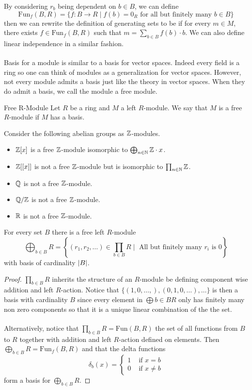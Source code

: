 \documentclass[a4paper]{article}
\begin{document}
By considering $r_b$ being dependent on $b\in B$, we can define $$\text{Fun}_f(B,R)=\{f:B\to R\;|\;f(b)=0_R\text{ for all but finitely many }b\in B\}$$ then we can rewrite the definition of generating sets to be if for every $m\in M$, there exists $f\in\text{Fun}_f(B,R)$ such that $m=\sum_{b\in B}f(b)\cdot b$. We can also define linear independence in a similar fashion. \\~\\

Basis for a module is similar to a basis for vector spaces. Indeed every field is a ring so one can think of modules as a generalization for vector spaces. However, not every module admits a basis just like the theory in vector spaces. When they do admit a basis, we call the module a free module. 

\begin{defn}{Free R-Module}{} Let $R$ be a ring and $M$ a left $R$-module. We say that $M$ is a free $R$-module if $M$ has a basis. 
\end{defn}

\begin{eg}{}{} Consider the following abelian groups as $\mathbb{Z}$-modules. 
\begin{itemize}
\item $\mathbb{Z}[x]$ is a free $\mathbb{Z}$-module isomorphic to $\bigoplus_{n\in\mathbb{N}}\mathbb{Z}\cdot x$. 
\item $\mathbb{Z}[[x]]$ is not a free $\mathbb{Z}$-module but is isomorphic to $\prod_{n\in\mathbb{N}}\mathbb{Z}$. 
\item $\mathbb{Q}$ is not a free $\mathbb{Z}$-module. 
\item $\mathbb{Q}/\mathbb{Z}$ is not a free $\mathbb{Z}$-module. 
\item $\mathbb{R}$ is not a free $\mathbb{Z}$-module. 
\end{itemize}
\end{eg}

\begin{lmm}{}{} For every set $B$ there is a free left $R$-module $$\bigoplus_{b\in B}R=\left\{(r_1,r_2,\dots)\in\prod_{b\in B}R\;|\;\text{ All but finitely many }r_i\text{ is }0\right\}$$ with basis of cardinality $\abs{B}$. \tcbline
\begin{proof}
$\prod_{b\in B}R$ inherits the structure of an $R$-module be defining component wise addition and left $R$-action. Notice that $\{(1,0,\dots,),(0,1,0,\dots),\dots\}$ is then a basis with cardinality $B$ since every element in $\bigoplus{b\in B}R$ only has finitely many non zero components so that it is a unique linear combination of the the set. \\~\\

Alternatively, notice that $\prod_{b\in B}R=\text{Fun}(B,R)$ the set of all functions from $B$ to $R$ together with addition and left $R$-action defined on elements. Then $\bigoplus_{b\in B}R=\text{Fun}_f(B,R)$ and that the delta functions $$\delta_b(x)=\begin{cases}
1 & \text{ if } x=b\\
0 & \text{ if } x\neq b
\end{cases}$$ form a basis for $\bigoplus_{b\in B}R$. 
\end{proof}
\end{lmm}
\end{document}
